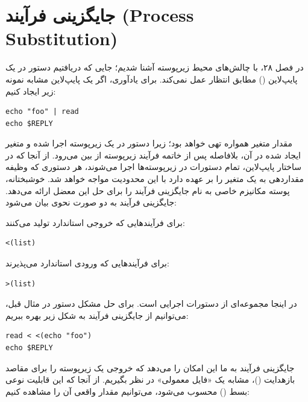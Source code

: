 \section{جایگزینی فرآیند (Process Substitution)}

در فصل ۲۸، با چالش‌های محیط زیرپوسته آشنا شدیم؛ جایی که دریافتیم دستور  در یک پایپ‌لاین () مطابق انتظار عمل نمی‌کند. برای یادآوری، اگر یک پایپ‌لاین مشابه نمونه زیر ایجاد کنیم:

\begin{latin}
\begin{lstlisting}
echo "foo" | read
echo $REPLY
\end{lstlisting}
\end{latin}

مقدار متغیر  همواره تهی خواهد بود؛ زیرا دستور  در یک زیرپوسته اجرا شده و متغیر  ایجاد شده در آن، بلافاصله پس از خاتمه فرآیند زیرپوسته از بین می‌رود. از آنجا که در ساختار پایپ‌لاین، تمام دستورات در زیرپوسته‌ها اجرا می‌شوند، هر دستوری که وظیفه مقداردهی به یک متغیر را بر عهده دارد با این محدودیت مواجه خواهد شد. خوشبختانه، پوسته  مکانیزم خاصی به نام جایگزینی فرآیند را برای حل این معضل ارائه می‌دهد. جایگزینی فرآیند به دو صورت نحوی بیان می‌شود:

برای فرآیندهایی که خروجی استاندارد تولید می‌کنند:

\begin{latin}
\begin{lstlisting}
<(list)
\end{lstlisting}
\end{latin}

برای فرآیندهایی که ورودی استاندارد می‌پذیرند:

\begin{latin}
\begin{lstlisting}
>(list)
\end{lstlisting}
\end{latin}

در اینجا  مجموعه‌ای از دستورات اجرایی است. برای حل مشکل دستور  در مثال قبل، می‌توانیم از جایگزینی فرآیند به شکل زیر بهره ببریم:

\begin{latin}
\begin{lstlisting}
read < <(echo "foo")
echo $REPLY
\end{lstlisting}
\end{latin}

جایگزینی فرآیند به ما این امکان را می‌دهد که خروجی یک زیرپوسته را برای مقاصد بازهدایت ()، مشابه یک «فایل معمولی» در نظر بگیریم. از آنجا که این قابلیت نوعی بسط () محسوب می‌شود، می‌توانیم مقدار واقعی آن را مشاهده کنیم:

